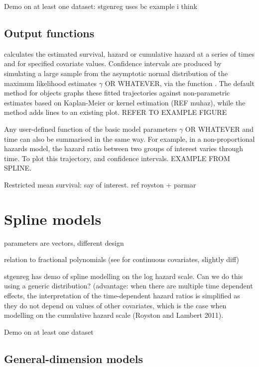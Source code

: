 \documentclass[nojss,nofooter]{jss}\usepackage[]{graphicx}\usepackage[]{color}
\begin{document}
Demo on at least one dataset: stgenreg uses bc example i think




\subsection{Output functions}

 calculates the estimated survival, hazard
or cumulative hazard at a series of times and for specified covariate
values. Confidence intervals are produced by simulating a large sample
from the asymptotic normal distribution of the maximum likelihood
estimates $\gamma$ OR WHATEVER, via the function
.  The default  method for
 objects graphs these fitted trajectories against
non-parametric estimates based on Kaplan-Meier or kernel estimation
(REF muhaz), while the  method adds lines to an existing
plot.  REFER TO EXAMPLE FIGURE

Any user-defined function of the basic model parameters $\gamma$ OR
WHATEVER and time can also be summarised in the same way.  For
example, in a non-proportional hazards model, the hazard ratio between
two groups of interest varies through time.  To plot this trajectory,
and confidence intervals.   EXAMPLE FROM SPLINE. 

Restricted mean survival: say of interest. ref royston + parmar


\section{Spline models}

parameters are vectors, different design

relation to fractional polynomials 
(see  for continuous covariates, slightly diff)

stgenreg has demo of spline modelling on the log hazard scale.  Can we do this using a generic distribution? 
(advantage: when there are multiple time dependent effects, the
interpretation of the time-dependent hazard ratios is simplified as
they do not depend on values of other covariates, which is the case
when modelling on the cumulative hazard scale (Royston and Lambert
2011).

Demo on at least one dataset 

\subsection{General-dimension models}
\label{sec:gdim}
\end{document}
